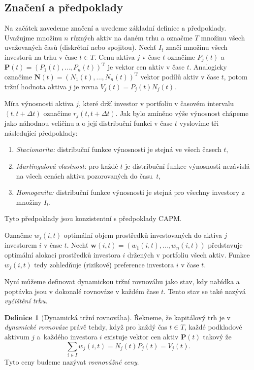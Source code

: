 \documentclass[a4paper,12pt]{report}
\theoremstyle{definition} \newtheorem{definice}[veta]{Definice}
\theoremstyle{remark}
\begin{document}
\subsection{Značení a předpoklady}
Na začátek zavedeme značení a  uvedeme základní definice a předpoklady. 
Uvažujme množinu $n$ různých aktiv na daném trhu a označme $T$ množinu všech uvažovaných časů (diskrétní nebo spojitou).
Nechť $I_t$ značí množinu všech investorů na trhu v čase $t\in T$.
Cenu aktiva $j$ v čase $t$ označíme $P_j(t)$ a $\boldsymbol{P}(t)=(P_1(t),\dots,P_n(t))^\mathrm{T}$ je vektor cen aktiv v čase $t$.
Analogicky označíme $\boldsymbol{N}(t)=(N_1(t),\dots,N_n(t))^\mathrm{T}$ vektor podílů aktiv v čase $t$, potom tržní hodnota aktiva $j$ je rovna $V_j(t)=P_j(t)N_j(t)$.

Míra výnosnosti aktiva $j$, které drží investor v portfoliu v časovém intervalu $(t,t+\Delta t)$ označíme $r_j(t,t+\Delta t)$.
Jak bylo zmíněno výše výnosnost chápeme jako náhodnou veličinu a o její distribuční funkci v čase $t$ vyslovíme tři následující předpoklady:
\begin{enumerate}
\item \label{Stacionarita} \textit{Stacionarita:} distribuční funkce výnosnosti  je stejná ve všech časech $t$,                                                                            
\item \label{Martingalvl} \textit{Martingalová vlastnost:} pro každé $t$ je distribuční funkce výnosnosti nezávislá na všech cenách aktiva pozorovaných do času~$t$,
\item \label{Homogenita} \textit{Homogenita:} distribuční funkce výnosnosti je stejná pro všechny investory z množiny $I_t$. 
\end{enumerate} 
Tyto předpoklady jsou konzistentní s předpoklady CAPM.

Označme $w_{j}(i,t)$ optimální objem prostředků investovaných do aktiva $j$ investorem $i$ v čase $t$.
Nechť $\boldsymbol{w}(i,t)=(w_{1}(i,t),\dots,w_{n}(i,t))$ představuje optimální alokaci prostředků investora $i$ držených v portfoliu všech aktiv.
Funkce $w_{j}(i,t)$ tedy zohledňuje (rizikové) preference investora $i$ v čase $t$.
  
Nyní můžeme definovat dynamickou tržní rovnováhu jako stav, kdy  nabídka a poptávka jsou v dokonalé rovnováze v každém čase $t$.
Tento stav se také nazývá \textit{vyčištění trhu}.
         
\begin{definice}[Dynamická tržní rovnováha]
Řekneme, že kapitálový trh je v \textit{dynamické rovnováze} právě tehdy, když pro každý čas $t\in T$, každé podkladové aktivum $j$ a~každého investora $i$ existuje vektor cen aktiv $\boldsymbol{P}(t)$ takový že
$$\sum_{i\in I} w_{j}(i,t)=N_j(t)P_j(t)=V_j(t).$$
Tyto ceny budeme nazývat \textit{rovnovážné ceny}.
\end{definice}
\end{document}
